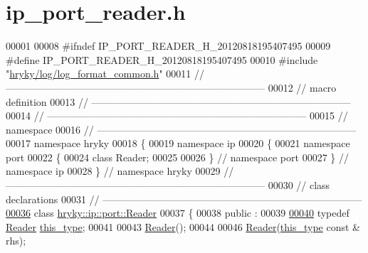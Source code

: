 \hypertarget{ip__port__reader_8h_source}{\section{ip\-\_\-port\-\_\-reader.\-h}
}

\begin{DoxyCode}
00001 
00008 \textcolor{preprocessor}{#ifndef IP\_PORT\_READER\_H\_20120818195407495}
00009 \textcolor{preprocessor}{}\textcolor{preprocessor}{#define IP\_PORT\_READER\_H\_20120818195407495}
00010 \textcolor{preprocessor}{}\textcolor{preprocessor}{#include "\hyperlink{log__format__common_8h}{hryky/log/log_format_common.h}"}
00011 \textcolor{comment}{//
      ------------------------------------------------------------------------------}
00012 \textcolor{comment}{// macro definition}
00013 \textcolor{comment}{//
      ------------------------------------------------------------------------------}
00014 \textcolor{comment}{//
      ------------------------------------------------------------------------------}
00015 \textcolor{comment}{// namespace}
00016 \textcolor{comment}{//
      ------------------------------------------------------------------------------}
00017 \textcolor{keyword}{namespace }hryky
00018 \{
00019 \textcolor{keyword}{namespace }ip
00020 \{
00021 \textcolor{keyword}{namespace }port
00022 \{
00024     \textcolor{keyword}{class }Reader;
00025 
00026 \} \textcolor{comment}{// namespace port}
00027 \} \textcolor{comment}{// namespace ip}
00028 \} \textcolor{comment}{// namespace hryky}
00029 \textcolor{comment}{//
      ------------------------------------------------------------------------------}
00030 \textcolor{comment}{// class declarations}
00031 \textcolor{comment}{//
      ------------------------------------------------------------------------------}
\hypertarget{ip__port__reader_8h_source_l00036}{}\hyperlink{classhryky_1_1ip_1_1port_1_1_reader}{00036} \textcolor{comment}{}\textcolor{keyword}{class }\hyperlink{classhryky_1_1ip_1_1port_1_1_reader}{hryky::ip::port::Reader}
00037 \{
00038 \textcolor{keyword}{public} :
00039 
\hypertarget{ip__port__reader_8h_source_l00040}{}\hyperlink{classhryky_1_1ip_1_1port_1_1_reader_a5ed0fa6cde14d55890bca881ddacbd24}{00040}     \textcolor{keyword}{typedef} \hyperlink{classhryky_1_1ip_1_1port_1_1_reader}{Reader} \hyperlink{classhryky_1_1ip_1_1port_1_1_reader_a5ed0fa6cde14d55890bca881ddacbd24}{this_type};
00041 
00043     \hyperlink{classhryky_1_1ip_1_1port_1_1_reader_a3272cfc0652cfa5e63bfea0eabbe858b}{Reader}();
00044 
00046     \hyperlink{classhryky_1_1ip_1_1port_1_1_reader_a3272cfc0652cfa5e63bfea0eabbe858b}{Reader}(\hyperlink{classhryky_1_1ip_1_1port_1_1_reader}{this_type} \textcolor{keyword}{const} & rhs);

\end{DoxyCode}
